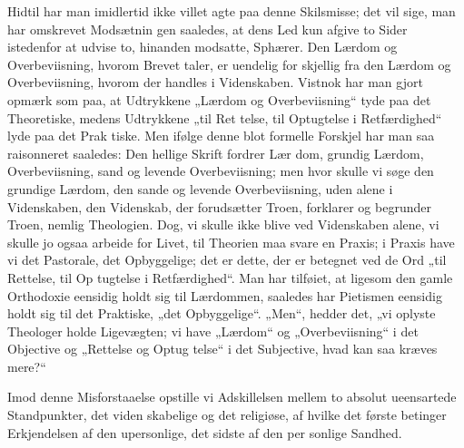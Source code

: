 \documentclass[12pt]{book}
\newcommand{\opage}[1]{\marginnote{\footnotesize\textit{[#1]}}}
\begin{document}
Hidtil har man imidlertid ikke villet agte paa denne
Skilsmisse; det vil sige, man har omskrevet Modsætnin\-%
gen saaledes, at dens Led kun afgive to Sider istedenfor at
udvise to, hinanden modsatte, Sphærer. Den Lærdom og
Overbeviisning, hvorom Brevet taler, er uendelig for\-%
skjellig fra den Lærdom og Overbeviisning, hvorom der
handles i Videnskaben. Vistnok har man gjort opmærk\-%
som paa, at Udtrykkene „Lærdom og Overbeviisning“
tyde paa det Theoretiske, medens Udtrykkene „til Ret\-%
telse, til Optugtelse i Retfærdighed“ lyde paa det Prak\-%
tiske. Men ifølge denne blot formelle Forskjel har man
saa raisonneret saaledes: Den hellige Skrift fordrer Lær\-%
dom, grundig Lærdom, Overbeviisning, sand og levende
\opage{195}\setcounter{footnote}{0}%
Overbeviisning; men hvor skulle vi søge den grundige
Lærdom, den sande og levende Overbeviisning, uden alene
i Videnskaben, den Videnskab, der forudsætter Troen,
forklarer og begrunder Troen, nemlig Theologien. Dog,
vi skulle ikke blive ved Videnskaben alene, vi skulle jo
ogsaa arbeide for Livet, til Theorien maa svare en Praxis;
i Praxis have vi det Pastorale, det Opbyggelige; det er
dette, der er betegnet ved de Ord „til Rettelse, til Op\-%
tugtelse i Retfærdighed“. Man har tilføiet, at ligesom
den gamle Orthodoxie eensidig holdt sig til Lærdommen,
saaledes har Pietismen eensidig holdt sig til det Praktiske,
„det Opbyggelige“. „Men“, hedder det, „vi oplyste
Theologer holde Ligevægten; vi have „Lærdom“ og
„Overbeviisning“ i det Objective og „Rettelse og Optug\-%
telse“ i det Subjective, hvad kan saa kræves mere?“

Imod denne Misforstaaelse opstille vi Adskillelsen
mellem to absolut ueensartede Standpunkter, det viden\-%
skabelige og det religiøse, af hvilke det første betinger
Erkjendelsen af den upersonlige, det sidste af den per\-%
sonlige Sandhed.
\end{document}
